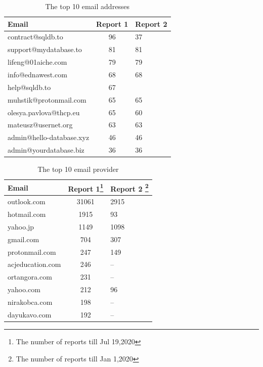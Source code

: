 \begin{table}[htbp]
\centering
 \caption{The top 10 email addresses\label{table:top10email}}
 \begin{tabular}{lcl}
  \toprule
  Email & Report 1& Report 2 \\
  \midrule
 contract@sqldb.to & 96 & 37\\
 support@mydatabase.to & 81 & 81 \\
 lifeng@01aiche.com & 79 & 79 \\
 info@ednawest.com & 68 & 68\\
 help@sqldb.to & 67 &  \\
 muhstik@protonmail.com & 65 & 65 \\
 olesya.pavlova@thcp.eu& 65 & 60\\
 mateusz@usernet.org & 63 & 63 \\
 admin@hello-database.xyz & 46 & 46\\
 admin@yourdatabase.biz & 36 & 36\\
  \bottomrule
 \end{tabular}
 
\end{table}


\begin{table}[htbp]
\centering
 \caption{The top 10 email provider\label{table:email_provider}}
 \begin{tabular}{lcl}
  \toprule
  Email & Report 1\footnote{The number of reports till Jul 19,2020 } & Report 2 \footnote{The number of reports till Jan 1,2020}\\
  \midrule
 outlook.com &31061 & 2915 \\
 hotmail.com & 1915&  93 \\
 yahoo.jp & 1149 & 1098 \\
 gmail.com & 704& 307 \\
 protonmail.com & 247&149 \\
 acjeducation.com & 246& --\\
 ortangora.com & 231 & --\\
 yahoo.com & 212&96\\
 nirakobca.com & 198& --\\
 dayukavo.com & 192 & --\\
  \bottomrule
 \end{tabular}
\end{table}




